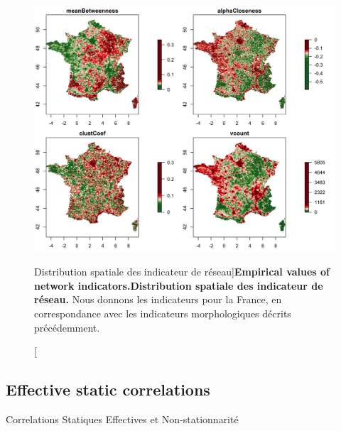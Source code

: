 \begin{figure}
\includegraphics[width=\linewidth]{Figures/Final/4-1-2-fig-staticcorrs-network}
\caption[Empirical values of network indicators][Distribution spatiale des indicateur de réseau]{\textbf{Empirical values of network indicators.}\label{fig:staticcorrs:network}}{\textbf{Distribution spatiale des indicateur de réseau.} Nous donnons les indicateurs pour la France, en correspondance avec les indicateurs morphologiques décrits précédemment.\label{fig:staticcorrs:network}}
\end{figure}





\subsection{Effective static correlations}{Correlations Statiques Effectives et Non-stationnarité}





